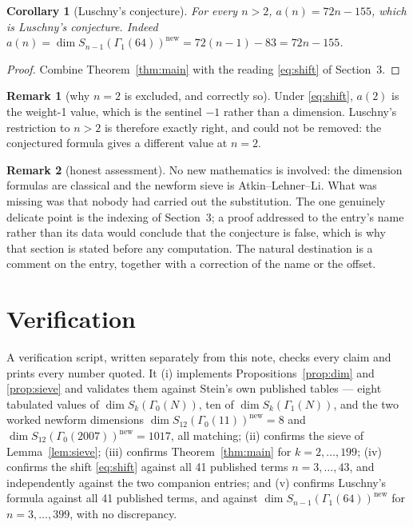 \documentclass[11pt,a4paper]{article}
\theoremstyle{plain}
\newtheorem{corollary}[theorem]{Corollary}
\theoremstyle{definition}
\newtheorem*{remark}{Remark}
\begin{document}
\begin{corollary}[Luschny's conjecture]\label{cor:main}
For every $n>2$, $a(n)=72n-155$, which is Luschny's conjecture. Indeed
$a(n)=\dim S_{n-1}(\Gamma_{1}(64))^{\mathrm{new}}=72(n-1)-83=72n-155$.
\end{corollary}

\begin{proof}
Combine Theorem~\ref{thm:main} with the reading \eqref{eq:shift} of Section~3.
\end{proof}

\begin{remark}[why $n=2$ is excluded, and correctly so]
Under \eqref{eq:shift}, $a(2)$ is the weight-1 value, which is the sentinel $-1$ rather
than a dimension. Luschny's restriction to $n>2$ is therefore exactly right, and could not
be removed: the conjectured formula gives a different value at $n=2$.
\end{remark}

\begin{remark}[honest assessment]
No new mathematics is involved: the dimension formulas are classical and the newform sieve
is Atkin--Lehner--Li. What was missing was that nobody had carried out the substitution.
The one genuinely delicate point is the indexing of Section~3; a proof addressed to the
entry's name rather than its data would conclude that the conjecture is false, which is why
that section is stated before any computation. The natural destination is a comment on the
entry, together with a correction of the name or the offset.
\end{remark}

\section{Verification}

A verification script, written separately from this note, checks every claim and prints
every number quoted. It (i) implements Propositions~\ref{prop:dim} and \ref{prop:sieve} and
validates them against Stein's own published tables --- eight tabulated values of
$\dim S_{k}(\Gamma_{0}(N))$, ten of $\dim S_{k}(\Gamma_{1}(N))$, and the two worked newform
dimensions $\dim S_{12}(\Gamma_{0}(11))^{\mathrm{new}}=8$ and
$\dim S_{12}(\Gamma_{0}(2007))^{\mathrm{new}}=1017$, all matching; (ii) confirms the sieve
of Lemma~\ref{lem:sieve}; (iii) confirms Theorem~\ref{thm:main} for $k=2,\dots,199$;
(iv) confirms the shift \eqref{eq:shift} against all 41 published terms
$n=3,\dots,43$, and independently against the two companion entries; and (v) confirms
Luschny's formula against all 41 published terms, and against
$\dim S_{n-1}(\Gamma_{1}(64))^{\mathrm{new}}$ for $n=3,\dots,399$, with no discrepancy.
\end{document}
